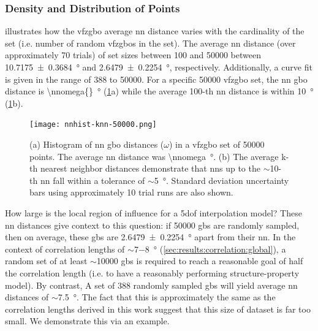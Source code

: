 \documentclass[final,twocolumn,12pt]{elsarticle}
\begin{document}
	\subsubsection{Density and Distribution of Points} \label{sec:results:density}
	
	 illustrates how the \gls{vfzgbo} average \gls{nn} distance varies with the cardinality of the set (i.e. number of random \glspl{vfzgbo} in the set). The average \gls{nn} distance (over approximately 70 trials) of set sizes between \num{100} and \num{50000} between \SI{10.7175 \pm 0.3684}{\degree} and \SI{2.6479 \pm 0.2254}{\degree}, respectively. Additionally, a curve fit is given in the range of \num{388} to \num{50000}. For a specific \num{50000} \gls{vfzgbo} set, the \gls{nn} \gls{gbo} distance is \SI{\nnomega{}}{\degree} (\cref{fig:nnhist-knn-50000}a) while the average 100-th \gls{nn} distance is within \SI{10}{\degree} (\cref{fig:nnhist-knn-50000}b).
	
	\begin{figure}
		\centering
		\texttt{[image: nnhist-knn-50000.png]}
		\caption{(a) Histogram of \gls{nn} \gls{gbo} distances ($\omega$) in a \gls{vfzgbo} set of \num{50000} points. The average \gls{nn} distance was \SI{\nnomega}{\degree}. (b) The average k-th nearest neighbor distances demonstrate that \glspl{nn} up to the $\sim$\num{10}-th \gls{nn} fall within a tolerance of $\sim$\SI{5}{\degree}. Standard deviation uncertainty bars using approximately 10 trial runs are also shown. }
		\label{fig:nnhist-knn-50000}
	\end{figure}
	
	How large is the local region of influence for a \gls{5dof} interpolation model? These \gls{nn} distances give context to this question: if \num{50000} \glspl{gb} are randomly sampled, then on average, these \glspl{gb} are \SI{2.6479 \pm 0.2254}{\degree} apart from their \gls{nn}. In the context of correlation lengths of $\sim$\num{7}$-$\SI{8}{\degree} (\cref{sec:results:correlation:global}), a random set of at least $\sim$\num{10000} \glspl{gb} is required to reach a reasonable goal of half the correlation length (i.e. to have a reasonably performing structure-property model). By contrast, A set of \num{388} randomly sampled \glspl{gb} will yield average \gls{nn} distances of $\sim$\SI{7.5}{\degree}. The fact that this is approximately the same as the correlation lengths derived in this work suggest that this size of dataset is far too small. We demonstrate this via an example.
	
\end{document}
